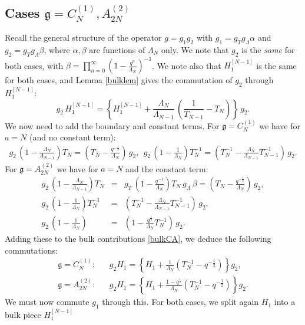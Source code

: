 \documentclass[12pt]{amsart}
\newcommand{\g}{{\mathfrak{g}}}
\newcommand{\al}{{\alpha}}
\newcommand{\lL}{{\Lambda}}
\numberwithin{equation}{section}
\begin{document}
\subsection{Cases $\g=C_{N}^{(1)},A_{2N}^{(2)}$} \label{CAsecs}
Recall the general structure of the operator $g=g_1 g_2$ with $g_1=g_T g_\lL \al $ and $g_2=g_T g_\lL \beta $, where $\al,\beta$ are functions of $\lL_N$ only. We note that $g_2$ is the {\it same} for both cases, with $\beta=\prod_{n=0}^\infty \left(1-\frac{q^n}{\lL_N}\right)^{-1}$. We note also that $H_1^{[N-1]}$ is the same for both cases, and Lemma \ref{bulklem} gives the commutation of $g_2$ through $H_1^{[N-1]}$:
\begin{equation}
\label{bulkCA}
g_2\,  H_1^{[N-1]}= \left\{ H_1^{[N-1]} +\frac{\lL_{N}}{\lL_{N-1}}\,\left(\frac{1}{T_{N-1}}- T_{N}\right)\right\}\, g_2.
\end{equation}
We now need to add the boundary and constant terms.
For $\g=C_N^{(1)}$ we have for $a=N$ (and no constant term):
\begin{eqnarray*}
%
%
%
%
g_{2}\, \left(1-\frac{\Lambda_{N}}{\Lambda_{N-1}}\right) T_N=
\left(T_N-\frac{q^{-\frac{1}{2}}}{\Lambda_{N}}\right)\, g_{2},\ \
g_{2}\, \left(1-\frac{1}{\Lambda_{N}}\right) T_N^{-1}= 
\left(T_N^{-1}-\frac{\Lambda_{N}}{\Lambda_{N-1}}T_{N-1}^{-1}\right)\, g_{2}.
\end{eqnarray*}
For $\g=A_{2N}^{(2)}$ we have for $a=N$ and the constant term:
\begin{eqnarray*}
g_2\, \left( 1- \frac{\lL_N}{\lL_{N-1}}\right)T_N &=&g_T\,\left(1- \frac{q^{-1}}{\lL_N}\right)T_N\,g_\lL\,\beta
=\left(T_N-\frac{q^{-\frac{1}{2}}}{\lL_N}\right)\, g_2,\\
g_2\, \left( 1- \frac{1}{\lL_N}\right)T_N^{-1}&=&\left(T_N^{-1}-\frac{\lL_N}{\lL_{N-1}}T_{N-1}^{-1}\right)\, g_2,\\
g_2\, \left( 1- \frac{1}{\lL_N}\right) &=&\left(1-  \frac{q^\frac{1}{2}}{\lL_N}T_N^{-1}\right)\, g_2.
\end{eqnarray*}
Adding these to the bulk contributions \eqref{bulkCA}, we deduce the following commutations:
\begin{eqnarray}
\g=C_N^{(1)}: && g_2 H_1=\left\{ H_1+ \frac{1}{\lL_N}(T_N^{-1}-q^{-\frac{1}{2}})\right\} g_2,\label{g2C}\\
\g=A_{2N}^{(2)}:&& g_2 H_1=\left\{ H_1+ \frac{1-q^\frac{1}{2}}{\lL_N}(T_N^{-1}-q^{-\frac{1}{2}})\right\} g_2.\label{g2A}
\end{eqnarray}
We must now commute $g_1$ through this. For both cases, we split again $H_1$ into a bulk piece $H_1^{[N-1]}$
\end{document}
